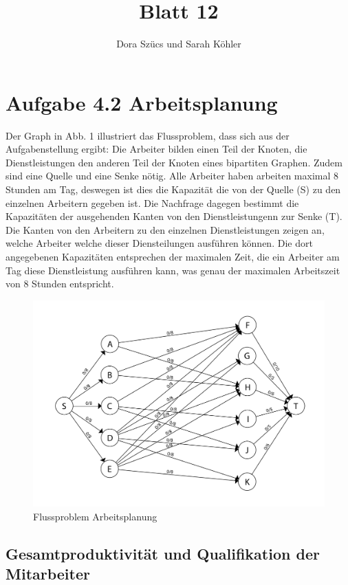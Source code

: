 \documentclass[12pt]{amsart}
\title{Blatt 12}
\author{Dora Szücs und Sarah Köhler}
\begin{document}
\maketitle

\section*{Aufgabe 4.2 Arbeitsplanung}

Der Graph in Abb. 1 illustriert das Flussproblem, dass sich aus der Aufgabenstellung ergibt: Die Arbeiter bilden einen Teil der Knoten, die Dienstleistungen den anderen Teil der Knoten eines bipartiten Graphen. Zudem sind eine Quelle und eine Senke nötig.
Alle Arbeiter haben arbeiten maximal 8 Stunden am Tag, deswegen ist dies die Kapazität die von der Quelle (S) zu den einzelnen Arbeitern gegeben ist. Die Nachfrage dagegen bestimmt die Kapazitäten der ausgehenden Kanten von den Dienstleistungenn zur Senke (T). 
Die Kanten von den Arbeitern zu den einzelnen Dienstleistungen zeigen an, welche Arbeiter welche dieser Diensteilungen ausführen können. Die dort angegebenen Kapazitäten entsprechen der maximalen Zeit, die ein Arbeiter am Tag diese Dienstleistung ausführen kann, was genau der maximalen Arbeitszeit von 8 Stunden entspricht.

\begin{figure}[ht!]
\centering
\includegraphics[width=150mm]{flussgraph1.png}
\caption{Flussproblem Arbeitsplanung}
\label{overflow}
\end{figure}


\subsection*{Gesamtproduktivität und Qualifikation der Mitarbeiter}
\end{document}
